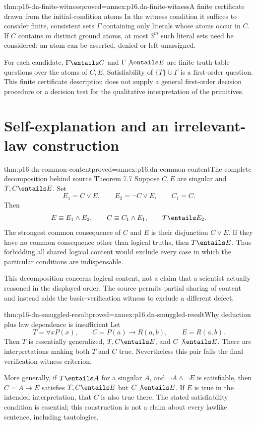 \begin{hbtheorem}{thm:p16-dn-finite-witness}{proved=annex:p16.dn-finite-witness}{A finite certificate drawn from the initial-condition atoms}
In the witness condition it suffices to consider
finite, consistent sets \(\Gamma\) containing
only literals whose atoms occur in \(C\).
If \(C\) contains \(m\) distinct ground atoms,
at most \(3^m\) such literal sets need be
considered: an atom can be asserted, denied
or left unassigned.

For each candidate, \(\Gamma\entails C\) and
\(\Gamma\not\entails E\) are finite truth-table
questions over the atoms of \(C,E\).
Satisfiability of \(\{T\}\cup\Gamma\) is a
first-order question. This finite certificate
description does not supply a general
first-order decision procedure or a decision
test for the qualitative interpretation of
the primitives.
\end{hbtheorem}

\section{Self-explanation and an irrelevant-law construction}
\label{sec:p16-dn-self-explanation}

\begin{hbtheorem}{thm:p16-dn-common-content}{proved=annex:p16.dn-common-content}{The complete decomposition behind source Theorem 7.7}
Suppose \(C,E\) are singular and \(T,C\entails E\).
Set
\[
 E_1=C\lor E,\qquad E_2=\neg C\lor E,\qquad C_1=C.
\]
Then
\[
 E\equiv E_1\land E_2,\qquad
 C\equiv C_1\land E_1,\qquad T\entails E_2 .
\]
The strongest common consequence of \(C\) and
\(E\) is their disjunction \(C\lor E\).
If they have no common consequence other
than logical truths, then \(T\entails E\).
Thus forbidding all shared logical content
would exclude every case in which the
particular conditions are indispensable.
\end{hbtheorem}

This decomposition concerns logical content,
not a claim that a scientist actually reasoned
in the displayed order. The source permits
partial sharing of content and instead adds
the basic-verification witness to exclude
a different defect.

\begin{hbtheorem}{thm:p16-dn-smuggled-result}{proved=annex:p16.dn-smuggled-result}{Why deduction plus law dependence is insufficient}
Let
\[
 T=\forall xP(x),\qquad C=P(a)\to R(a,b),
                         \qquad E=R(a,b).
\]
Then \(T\) is essentially generalized,
\(T,C\entails E\), and \(C\not\entails E\).
There are interpretations making both
\(T\) and \(C\) true. Nevertheless this
pair fails the final verification-witness
criterion.

More generally, if \(T\entails A\) for a
singular \(A\), and \(\neg A\land\neg E\)
is satisfiable, then \(C=A\to E\) satisfies
\(T,C\entails E\) but \(C\not\entails E\).
If \(E\) is true in the intended interpretation,
that \(C\) is also true there. The stated
satisfiability condition is essential;
this construction is not a claim about
every lawlike sentence, including tautologies.
\end{hbtheorem}

